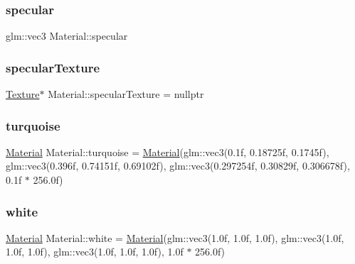 \mbox{\label{struct_material_aac1c499923ff99564cdd97a4b5e504a9}} 
\subsubsection{\texorpdfstring{specular}{specular}}
{\footnotesize\ttfamily glm\+::vec3 Material\+::specular}

\mbox{\label{struct_material_a1ca33d2644100f269b8289ddd08dd6e4}} 
\subsubsection{\texorpdfstring{specularTexture}{specularTexture}}
{\footnotesize\ttfamily \mbox{\hyperlink{class_texture}{Texture}}$\ast$ Material\+::specular\+Texture = nullptr}

\mbox{\label{struct_material_aa0d30b652e32ae61aa50cedf8ed38656}} 
\subsubsection{\texorpdfstring{turquoise}{turquoise}}
{\footnotesize\ttfamily \mbox{\hyperlink{struct_material}{Material}} Material\+::turquoise = \mbox{\hyperlink{struct_material}{Material}}(glm\+::vec3(0.\+1f, 0.\+18725f, 0.\+1745f), glm\+::vec3(0.\+396f, 0.\+74151f, 0.\+69102f), glm\+::vec3(0.\+297254f, 0.\+30829f, 0.\+306678f), 0.\+1f $\ast$ 256.\+0f)\hspace{0.3cm}{\ttfamily [static]}}

\mbox{\label{struct_material_a0bce3d9c7e1e38fbf55e85a0104c2564}} 
\subsubsection{\texorpdfstring{white}{white}}
{\footnotesize\ttfamily \mbox{\hyperlink{struct_material}{Material}} Material\+::white = \mbox{\hyperlink{struct_material}{Material}}(glm\+::vec3(1.\+0f, 1.\+0f, 1.\+0f), glm\+::vec3(1.\+0f, 1.\+0f, 1.\+0f), glm\+::vec3(1.\+0f, 1.\+0f, 1.\+0f), 1.\+0f $\ast$ 256.\+0f)\hspace{0.3cm}{\ttfamily [static]}}

